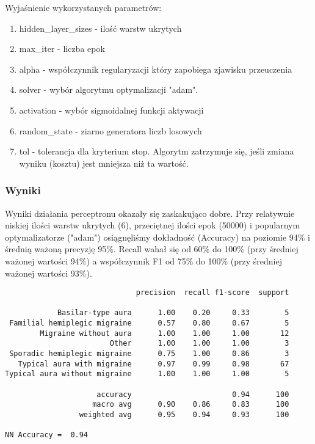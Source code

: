 Wyjaśnienie wykorzystanych parametrów:
\begin{enumerate}
    \item hidden\_layer\_sizes - ilość warstw ukrytych
    \item max\_iter - liczba epok
    \item alpha - współczynnik regularyzacji który zapobiega zjawisku przeuczenia
    \item solver - wybór algorytmu optymalizacji "adam".
    \item activation - wybór sigmoidalnej funkcji aktywacji
    \item random\_state - ziarno generatora liczb losowych
    \item tol - tolerancja dla kryterium stop. Algorytm zatrzymuje się, jeśli zmiana wyniku (kosztu) jest mniejsza niż ta wartość.
\end{enumerate}

\subsubsection{Wyniki}
Wyniki działania perceptronu okazały się zaskakująco dobre. Przy relatywnie niskiej ilości warstw ukrytych (6), przeciętnej ilości epok (50000) i popularnym optymalizatorze ("adam") osiągnęliśmy dokładność (Accuracy) na poziomie 94\% i średnią ważoną precyzję 95\%. Recall wahał się od 60\% do 100\% (przy średniej ważonej wartości 94\%) a współczynnik F1 od 75\% do 100\% (przy średniej ważonej wartości 93\%).\\
\begin{verbatim}
                              precision  recall f1-score  support

            Basilar-type aura      1.00    0.20     0.33        5
 Familial hemiplegic migraine      0.57    0.80     0.67        5
        Migraine without aura      1.00    1.00     1.00       12
                        Other      1.00    1.00     1.00        3
 Sporadic hemiplegic migraine      0.75    1.00     0.86        3
   Typical aura with migraine      0.97    0.99     0.98       67
Typical aura without migraine      1.00    1.00     1.00        5

                     accuracy                       0.94      100
                    macro avg      0.90    0.86     0.83      100
                 weighted avg      0.95    0.94     0.93      100

NN Accuracy =  0.94
\end{verbatim}

